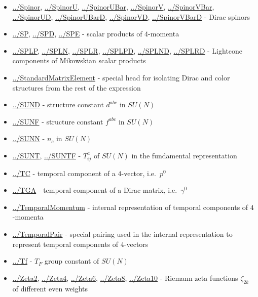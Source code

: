 \documentclass[../FeynCalcManual.tex]{subfiles}
\begin{document}
\begin{itemize}
\item
  \hyperlink{../spinor}{../Spinor}, \hyperlink{../spinoru}{../SpinorU},
  \hyperlink{../spinorubar}{../SpinorUBar},
  \hyperlink{../spinorv}{../SpinorV},
  \hyperlink{../spinorvbar}{../SpinorVBar},
  \hyperlink{../spinorud}{../SpinorUD},
  \hyperlink{../spinorubard}{../SpinorUBarD},
  \hyperlink{../spinorvd}{../SpinorVD},
  \hyperlink{../spinorvbard}{../SpinorVBarD} - Dirac spinors
\item
  \hyperlink{../sp}{../SP}, \hyperlink{../spd}{../SPD},
  \hyperlink{../spe}{../SPE} - scalar products of \(4\)-momenta
\item
  \hyperlink{../splp}{../SPLP}, \hyperlink{../spln}{../SPLN},
  \hyperlink{../splr}{../SPLR}, \hyperlink{../splpd}{../SPLPD},
  \hyperlink{../splnd}{../SPLND}, \hyperlink{../splrd}{../SPLRD} -
  Lightcone components of Mikowskian scalar products
\item
  \hyperlink{../standardmatrixelement}{../StandardMatrixElement} -
  special head for isolating Dirac and color structures from the rest of
  the expression
\item
  \hyperlink{../sund}{../SUND} - structure constant \(d^{abc}\) in
  \(SU(N)\)
\item
  \hyperlink{../sunf}{../SUNF} - structure constant \(f^{abc}\) in
  \(SU(N)\)
\item
  \hyperlink{../sunn}{../SUNN} - \(n_c\) in \(SU(N)\)
\item
  \hyperlink{../sunt}{../SUNT}, \hyperlink{../suntf}{../SUNTF} -
  \(T^a_{ij}\) of \(SU(N)\) in the fundamental representation
\item
  \hyperlink{../tc}{../TC} - temporal component of a \(4\)-vector,
  i.e.~\(p^0\)
\item
  \hyperlink{../tga}{../TGA} - temporal component of a Dirac matrix,
  i.e.~\(\gamma^0\)
\item
  \hyperlink{../temporalmomentum}{../TemporalMomentum} - internal
  representation of temporal components of \(4\)-momenta
\item
  \hyperlink{../temporalpair}{../TemporalPair} - special pairing used in
  the internal representation to represent temporal components of
  \(4\)-vectors
\item
  \hyperlink{../tf}{../Tf} - \(T_F\) group constant of \(SU(N)\)
\item
  \hyperlink{../zeta2}{../Zeta2}, \hyperlink{../zeta4}{../Zeta4},
  \hyperlink{../zeta6}{../Zeta6}, \hyperlink{../zeta8}{../Zeta8},
  \hyperlink{../zeta10}{../Zeta10} - Riemann zeta functions
  \(\zeta_{2k}\) of different even weights
\end{itemize}
\end{document}
